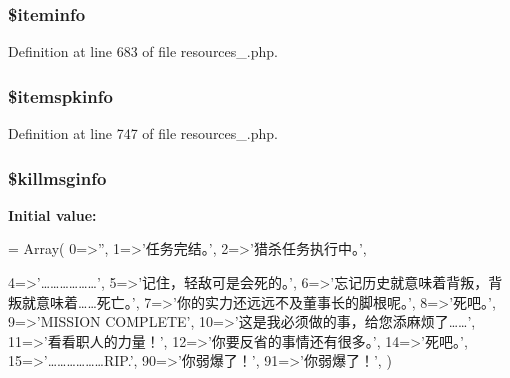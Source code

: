 \hypertarget{cache_2resources__1_8php_abf61f517048be2c7cc3d9c24e62f1160}{
\subsubsection[{\$iteminfo}]{\setlength{\rightskip}{0pt plus 5cm}\$iteminfo}}\label{cache_2resources__1_8php_abf61f517048be2c7cc3d9c24e62f1160}


Definition at line 683 of file resources\+\_.\+php.

\hypertarget{cache_2resources__1_8php_af5da654ca4941efa7e59e9608ad80106}{
\subsubsection[{\$itemspkinfo}]{\setlength{\rightskip}{0pt plus 5cm}\$itemspkinfo}}\label{cache_2resources__1_8php_af5da654ca4941efa7e59e9608ad80106}


Definition at line 747 of file resources\+\_.\+php.

\hypertarget{cache_2resources__1_8php_acfdab9efcdacf2869477a5e833712b40}{
\subsubsection[{\$killmsginfo}]{\setlength{\rightskip}{0pt plus 5cm}\$killmsginfo}}\label{cache_2resources__1_8php_acfdab9efcdacf2869477a5e833712b40}
{\bfseries Initial value\+:}
\begin{DoxyCode}
= Array(
    0=>\textcolor{stringliteral}{''},
    1=>\textcolor{stringliteral}{'任务完结。'},
    2=>\textcolor{stringliteral}{'猎杀任务执行中。'},
    
    4=>\textcolor{stringliteral}{'………………'},
    5=>\textcolor{stringliteral}{'记住，轻敌可是会死的。'},
    6=>\textcolor{stringliteral}{'忘记历史就意味着背叛，背叛就意味着……死亡。'},
    7=>\textcolor{stringliteral}{'你的实力还远远不及董事长的脚根呢。'},
    8=>\textcolor{stringliteral}{'死吧。'},
    9=>\textcolor{stringliteral}{'MISSION COMPLETE'},
    10=>\textcolor{stringliteral}{'这是我必须做的事，给您添麻烦了……'},
    11=>\textcolor{stringliteral}{'看看职人的力量！'},
    12=>\textcolor{stringliteral}{'你要反省的事情还有很多。'},
    14=>\textcolor{stringliteral}{'死吧。'},
    15=>\textcolor{stringliteral}{'………………RIP.'},
    90=>\textcolor{stringliteral}{'你弱爆了！'},
    91=>\textcolor{stringliteral}{'你弱爆了！'},
    )
\end{DoxyCode}


